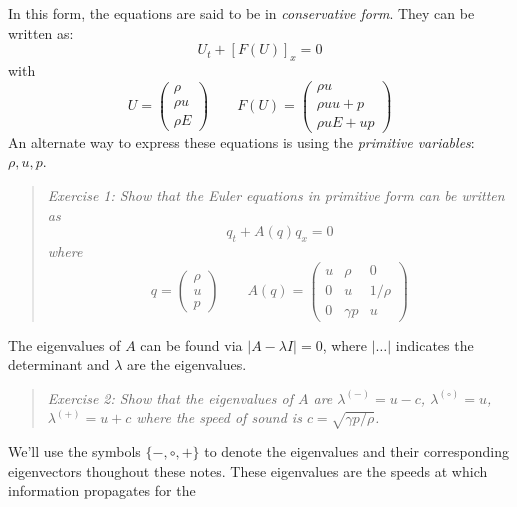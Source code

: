 \documentclass[11pt]{article}
\newcommand{\evm}{{(-)}}
\newcommand{\evz}{{(\circ)}}
\newcommand{\evp}{{(+)}}
\begin{document}
In this form, the equations are said to be in {\em conservative form}.  They
can be written as:
\begin{equation}
U_t + \left [F(U) \right ]_x = 0
\end{equation}
with
\begin{equation}
U = \left ( \begin{array}{c} \rho \\ \rho u \\ \rho E \end{array} \right )
%
\qquad
%
F(U) = \left ( \begin{array}{c} \rho u \\ \rho uu + p \\ \rho u E + up \end{array} \right )
\end{equation}
%
An alternate way to express these equations is using the {\em
  primitive variables}: $\rho, u, p$.
\begin{quote}
{\em Exercise 1: Show that the Euler equations in primitive form can be written
as 
\begin{equation}
q_t + A(q) q_x = 0
\end{equation}
where
\begin{equation}
q = \left ( \begin{array}{c} \rho \\ u \\ p \end{array} \right )
%
\qquad
A(q) = \left ( \begin{array}{ccc} u  & \rho     & 0 \\
                                  0  &  u       & 1/\rho \\
                                  0  & \gamma p & u \end{array} \right )
\end{equation}
}
\end{quote}
%
The eigenvalues of $A$ can be found via $| A - \lambda I | = 0$,
where $|\ldots|$ indicates the determinant and $\lambda$ are the eigenvalues.
\begin{quote}
{\em Exercise 2: 
Show that the eigenvalues of $A$ are $\lambda^\evm = u -c$, $\lambda^\evz = u$, $\lambda^\evp = u+c$ where the speed of sound is $c = \sqrt{\gamma p /\rho}$.
}
\end{quote}
We'll use the symbols $\{-,\circ,+\}$ to denote the eigenvalues and their
corresponding eigenvectors thoughout these notes.
These eigenvalues are the speeds at which information propagates for the
\end{document}
